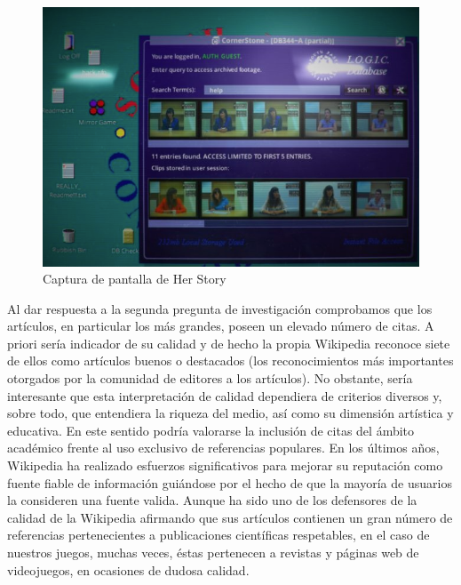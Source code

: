 \documentclass[spanish]{textolivre}
\begin{document}
\begin{figure}[htbp]
\centering
\begin{minipage}{.85\textwidth}
 \includegraphics[width=\textwidth]{fig06.png}
 \caption{Captura de pantalla de Her Story}
 \label{fig06}
\end{minipage}
\end{figure}

Al dar respuesta a la segunda pregunta de investigación comprobamos que los artículos, en particular los más grandes, poseen un elevado número de citas. A priori sería indicador de su calidad y de hecho la propia Wikipedia reconoce siete de ellos como artículos buenos o destacados (los reconocimientos más importantes otorgados por la comunidad de editores a los artículos). No obstante, sería interesante que esta interpretación de calidad dependiera de criterios diversos y, sobre todo, que entendiera la riqueza del medio, así como su dimensión artística y educativa. En este sentido podría valorarse la inclusión de citas del ámbito académico frente al uso exclusivo de referencias populares. En los últimos años, Wikipedia ha realizado esfuerzos significativos para mejorar su reputación como fuente fiable de información \cite{sahut_wikipedia:_2017} guiándose por el hecho de que la mayoría de usuarios la consideren una fuente valida. Aunque \textcite{colavizza_covid-19_2020} ha sido uno de los defensores de la calidad de la Wikipedia afirmando que sus artículos contienen un gran número de referencias pertenecientes a publicaciones científicas respetables, en el caso de nuestros juegos, muchas veces, éstas pertenecen a revistas y páginas web de videojuegos, en ocasiones de dudosa calidad.
\end{document}
